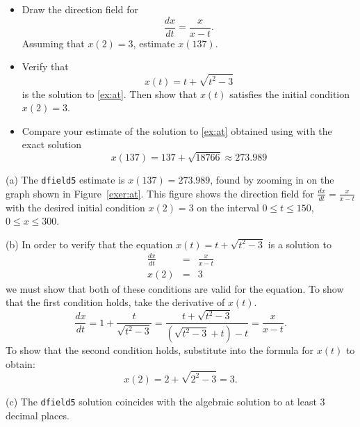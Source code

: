\documentclass{ximera}
\begin{document}
\begin{computerExercise}  \label{exer:at}
\begin{itemize}
\item[(a)]  Draw the direction field for
\begin{equation} \label{ex:at}
\frac{dx}{dt} = \frac{x}{x-t}.
\end{equation}
Assuming that $x(2)=3$, estimate $x(137)$.
\item[(b)]  Verify that
\[
x(t) = t + \sqrt{t^2-3}
\]
is the solution to \eqref{ex:at}.  Then show that $x(t)$ satisfies the
initial condition $x(2)=3$.
\item[(c)]  Compare your estimate of the solution to \eqref{ex:at}
obtained using {\dfield} with the exact solution
\[
x(137)= 137 +\sqrt{18766} \approx 273.989
\]
\end{itemize}

\begin{solution}

(a) The {\tt dfield5} estimate is $x(137) = 273.989$, found by zooming
in on the graph shown in Figure~\ref{exer:at}.  This figure shows the
direction field for $\frac{dx}{dt} = \frac{x}{x - t}$ with the desired
initial condition $x(2) = 3$ on the interval $0 \leq t \leq 150$, $0
\leq x \leq 300$.

(b) In order to verify that the equation $x(t) = t + \sqrt{t^2 - 3}$
is a solution to
\[
\begin{array}{rcl}
\frac{dx}{dt} & = & \frac{x}{x - t} \\
x(2) & = & 3\end{array}
\]
we must show that both of these conditions are valid for the equation.
To show that the first condition holds, take the derivative of $x(t)$.
\[
\frac{dx}{dt} = 1 + \frac{t}{\sqrt{t^2 - 3}} = \frac{t + {\sqrt{t^2 - 
3}}}{\left({\sqrt{t^2 - 3}} + t\right) - t} = \frac{x}{x - t}.
\]
To show that the second condition holds, substitute into the formula for
$x(t)$ to obtain:
\[ x(2) = 2 + \sqrt{2^2 - 3} = 3. \]

(c) The {\tt dfield5} solution coincides with the algebraic solution to at
least 3 decimal places.

\begin{figure}[htb]
                       \centerline{%
                       }
\end{figure}




\end{solution}
\end{computerExercise}
\end{document}
